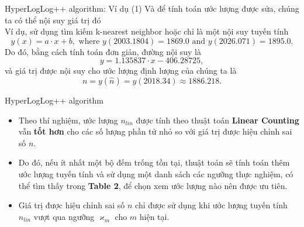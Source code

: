 \documentclass[10pt]{beamer}
\begin{document}
\begin{frame}{HyperLogLog++ algorithm: Ví dụ (1)}
  Và để tính toán ước lượng được sửa, chúng ta có thể nội suy giá trị đó\\
  Ví dụ, sử dụng tìm kiếm k-nearest neighbor hoặc chỉ là một nội suy tuyến tính
  \[y(x) = a \cdot x + b, \text{ where } y(2003.1804) = 1869.0 \text{ and } y(2026.071) = 1895.0.\]
  Do đó, bằng cách tính toán đơn giản, đường nội suy là
  \[y = 1.135837 \cdot x - 406.28725,\]
  và giá trị được nội suy cho ước lượng định lượng của chúng ta là
  \[n = y(\hat{n}) = y(2018.34) \approx 1886.218.\]
\end{frame}
\begin{frame}{HyperLogLog++ algorithm}
  \begin{itemize}
    \item Theo thí nghiệm, ước lượng $n_{lin}$ được tính theo thuật toán 
    \textbf{Linear Counting} vẫn \textbf{tốt hơn} cho các số lượng phần tử nhỏ so với giá trị được hiệu 
    chỉnh sai số $n$.
    \item Do đó, nếu ít nhất một bộ đếm trống tồn tại, thuật toán sẽ tính toán thêm 
    ước lượng tuyến tính và sử dụng một danh sách các ngưỡng thực nghiệm, có thể 
    tìm thấy trong \textbf{Table 2}, để chọn xem ước lượng nào nên được ưu tiên. 
    \item Giá trị được hiệu chỉnh sai số $n$ chỉ được sử dụng khi ước lượng tuyến tính 
    $n_{lin}$ vượt qua ngưỡng $\varkappa_m$ cho $m$ hiện tại.
  \end{itemize}
\end{frame}
\end{document}
